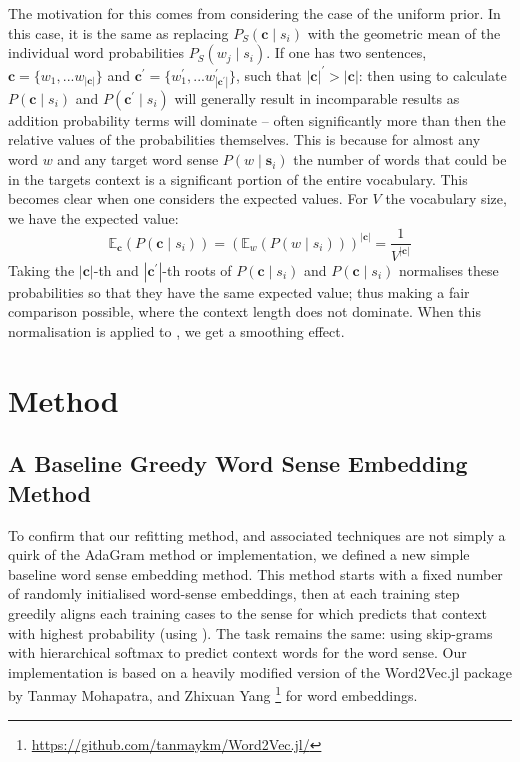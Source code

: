 \documentclass{sig-alternate}
\renewcommand{\c}{\mathbf{c}}
\newcommand{\s}{\mathbf{s}}
\begin{document}
The motivation for this comes from considering the case of the uniform prior.
In this case, it is the same as replacing $P_S(\c \mid s_{i})$ with the geometric mean of the individual word probabilities $P_S(w_j \mid s_{i})$.
If one has two sentences, $\c=\{w_1,...w_{|\c|}\}$ and $\c^\prime=\{w_1^\prime,...w^\prime_{|\c^\prime|}\}$, such that $|\c|^\prime > |\c|$:
then using  to calculate $P(\c \mid s_{i})$ and $P(\c^\prime \mid s_{i})$ will generally result in incomparable results as addition probability terms will dominate -- often significantly more than then the relative values of the probabilities themselves. This is because for almost any word $w$ and any target word sense $P(w \mid \s_i)$ the number of words that could be in the targets context is a significant portion of the entire vocabulary.
This becomes clear when one considers the expected values. For $V$ the vocabulary size, we have the expected value:
\begin{equation} \label{eq:expectcontexprob}
\mathbb{E}_\c(P(\c \mid s_{i}))
=(\mathbb{E}_w(P(w \mid s_i)))^{|\c|}
= \frac{1}{V^{|\c|}}
\end{equation}
Taking the $|\c|$-th and $|\c^\prime|$-th roots of $P(\c \mid s_{i})$ and $P(\c \mid s_{i})$ normalises these probabilities so that they have the same expected value; thus making a fair comparison possible, where the context length does not dominate.
When this normalisation is applied to , we get a smoothing effect.


\section{Method} \label{method}


\subsection{A Baseline Greedy Word Sense Embedding Method}

To confirm that our refitting method, and associated techniques are not simply a quirk of the AdaGram method or implementation, we defined a new simple baseline word sense embedding method.
This method starts with a fixed number of randomly initialised word-sense embeddings, then at each training step greedily aligns each training cases to the sense for which predicts that context with highest probability (using ). The task remains the same: using skip-grams with hierarchical softmax to predict context words for the word sense.
Our implementation is based on a heavily modified version of the Word2Vec.jl package by Tanmay Mohapatra, and Zhixuan Yang \footnote{\url{https://github.com/tanmaykm/Word2Vec.jl/}} for word embeddings.
\end{document}
